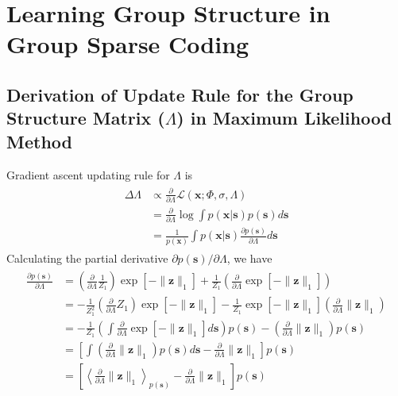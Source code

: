 \appendix

\chapter{Learning Group Structure in Group Sparse Coding}

\section{Derivation of Update Rule for the Group Structure Matrix ($\Lambda$) in Maximum Likelihood Method}
\label{app:mle}

Gradient ascent updating rule for $\Lambda$ is
\begin{align}
\begin{split}
\Delta\Lambda
	&\propto \frac{\partial}{\partial\Lambda}
		\mathcal{L}(\boldsymbol{x}; \Phi, \sigma, \Lambda) \\
	&=	\frac{\partial}{\partial\Lambda}\log\int
		p(\boldsymbol{x|s}) p(\boldsymbol{s}) d\boldsymbol{s} \\
	&=	\frac{1}{p(\boldsymbol{x})} \int p(\boldsymbol{x}|\boldsymbol{s})
		\frac{\partial p(\boldsymbol{s})}{\partial\Lambda}d\boldsymbol{s}
\end{split}
\end{align}
Calculating the partial derivative $\partial p(\boldsymbol{s}) / \partial\Lambda$, we have
\begin{align}
\begin{split}
\frac{\partial p(\boldsymbol{s})}{\partial\Lambda}
	&= \left( \frac{\partial}{\partial\Lambda}\frac{1}{Z_1} \right)
	   \exp\left[ -\|\boldsymbol{z}\|_1 \right] +
	   \frac{1}{Z_1}
	   \left( \frac{\partial}{\partial\Lambda}
	   \exp\left[ -\|\boldsymbol{z}\|_1 \right] \right) \\
	&= -\frac{1}{Z_1^2}
	   \left( \frac{\partial}{\partial\Lambda}Z_1 \right)
	   \exp\left[ -\|\boldsymbol{z}\|_1 \right] -
	   \frac{1}{Z_1} \exp\left[ -\|\boldsymbol{z}\|_1 \right]
	   \left( \frac{\partial}{\partial\Lambda}\|\boldsymbol{z}\|_1 \right)\\
	&= -\frac{1}{Z_1}
	   \left( \int \frac{\partial}{\partial\Lambda}
	   \exp\left[ -\|\boldsymbol{z}\|_1 \right]
	   d\boldsymbol{s} \right)
	   p(\boldsymbol{s}) -
	   \left( \frac{\partial}{\partial\Lambda}\|\boldsymbol{z}\|_1 \right)
	   p(\boldsymbol{s}) \\
	&= \left[
	   \int \left( \frac{\partial}{\partial\Lambda}\|\boldsymbol{z}\|_1 \right)
	   p(\boldsymbol{s}) d\boldsymbol{s} -
	   \frac{\partial}{\partial\Lambda}\|\boldsymbol{z}\|_1
	   \right] p(\boldsymbol{s}) \\
	&= \left[
	   \left<
	   \frac{\partial}{\partial\Lambda}\|\boldsymbol{z}\|_1
	   \right>_{p(\boldsymbol{s})} -
	   \frac{\partial}{\partial\Lambda}\|\boldsymbol{z}\|_1
	   \right] p(\boldsymbol{s})
\end{split}
\end{align}
